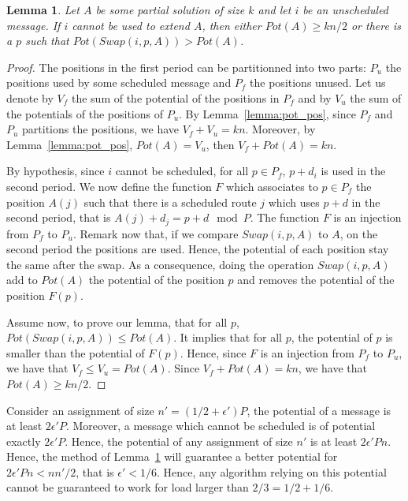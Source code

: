 \documentclass[10pt, conference, letterpaper]{IEEEtran}
\newtheorem{lemma}[theorem]{Lemma}
\begin{document}
\begin{lemma}\label{lemma:swap}
Let $A$ be some partial solution of size $k$ and let $i$ be an unscheduled message. If $i$ cannot be used to extend $A$, then either $Pot(A) \geq kn/2$ or there is a $p$ such that $Pot(Swap(i,p,A)) > Pot(A)$.
\end{lemma}

\begin{proof}
The positions in the first period can be partitionned into two parts: $P_{u}$ the positions used by some scheduled message and $P_{f}$ the positions unused.
Let us denote by $V_f$ the sum of the potential of the positions in $P_f$ and by $V_u$ the sum of the potentials of the positions of $P_u$. By Lemma~\ref{lemma:pot_pos}, since $P_f$ and $P_u$ partitions the positions, we have $V_f + V_u = kn$. Moreover, by Lemma~\ref{lemma:pot_pos}, $Pot(A) = V_u$, then $V_f + Pot(A) = kn$.

By hypothesis, since $i$ cannot be scheduled, for all $p \in P_{f}$, $p+d_i$ is used in the second period. We now define the function $F$ which associates to $p \in P_{f}$ the position $A(j)$ such that there is a scheduled route $j$ which uses $p+d$ in the second period, that is $A(j) + d_j = p + d \mod P$. The function $F$ is an injection from $P_{f}$ to $P_u$. Remark now that, if we compare $Swap(i,p,A)$ to $A$, on the second period the positions are used. Hence, the potential of each position stay the same after the swap. As a consequence, doing the operation $Swap(i,p,A)$ add to $Pot(A)$ the potential of the position $p$ and removes the potential of the position $F(p)$. 

Assume now, to prove our lemma, that for all $p$, $Pot(Swap(i,p,A)) \leq Pot(A)$. It implies that for all $p$, the potential of $p$ is smaller than the potential of $F(p)$. Hence,
since $F$ is an injection from $P_f$ to $P_u$, we have that $V_f \leq V_u = Pot(A)$.
Since $V_f + Pot(A) = kn$, we have that $Pot(A) \geq kn/2$.
\end{proof}

Consider an assignment of size $n' = (1/2 + \epsilon')P$, the potential of a message is at least $2\epsilon' P$. 
Moreover, a message which cannot be scheduled is of potential exactly  $2\epsilon' P$. Hence, the potential of 
any assignment of size $n'$ is at least $2\epsilon' P n $. Hence, the method of Lemma~\ref{lemma:swap} will guarantee a better potential for $2\epsilon' P n <  nn'/2$, that is $\epsilon' < 1/6$. Hence, any algorithm relying on this potential
cannot be guaranteed to work for load larger than $2/3 = 1/2 + 1/6$.
\end{document}
